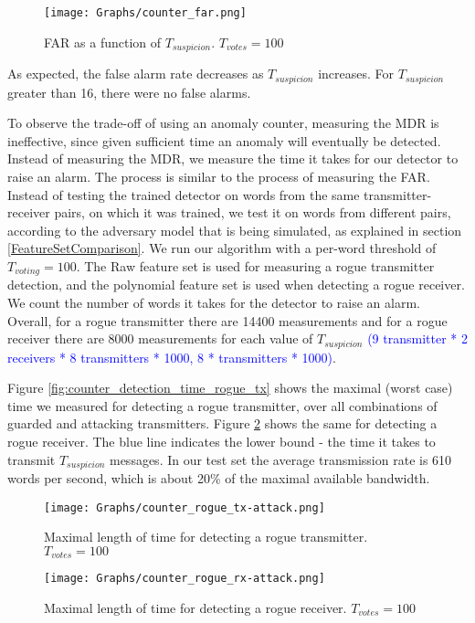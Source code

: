\documentclass[compsoc,conference,a4paper]{IEEEtran}
\begin{document}
  \begin{figure}[t]
    \centering
    \texttt{[image: Graphs/counter\_far.png]}
    \caption{FAR as a function of $T_{suspicion}$. $T_{votes} = 100$}
    \label{fig:counter_far}
  \end{figure}
  
  As expected, the false alarm rate decreases as $T_{suspicion}$ increases. For $T_{suspicion}$ greater than 16, there were no false alarms.
  
  To observe the trade-off of using an anomaly counter, measuring the MDR is ineffective, since given sufficient time an anomaly will eventually be detected. Instead of measuring the MDR, we measure the time it takes for our detector to raise an alarm. The process is similar to the process of measuring the FAR. Instead of testing the trained detector on words from the same transmitter-receiver pairs, on which it was trained, we test it on words from different pairs, according to the adversary model that is being simulated, as explained in section \ref{FeatureSetComparison}. We run our algorithm with a per-word threshold of $T_{voting} = 100$. The Raw feature set is used for measuring a rogue transmitter detection, and the polynomial feature set is used when detecting a rogue receiver. We count the number of words it takes for the detector to raise an alarm. Overall, for a rogue transmitter there are 14400 measurements and for a rogue receiver there are 8000 measurements for each value of $T_{suspicion}$ \textcolor{blue}{(9 transmitter * 2 receivers * 8 transmitters * 1000, 8 * transmitters * 1000)}.
  
  Figure \ref{fig:counter_detection_time_rogue_tx} shows the maximal (worst case) time we measured for detecting a rogue transmitter, over all combinations of guarded and attacking transmitters. Figure \ref{fig:counter_detection_time_rogue_rx} shows the same for detecting a rogue receiver. The blue line indicates the lower bound - the time it takes to transmit $T_{suspicion}$ messages. In our test set the average transmission rate is 610 words per second, which is about 20\% of the maximal available bandwidth.
  
  \begin{figure}[t]
    \centering
    \texttt{[image: Graphs/counter\_rogue\_tx-attack.png]}
    \caption{Maximal length of time for detecting a rogue transmitter. $T_{votes} = 100$}
    \label{fig:counter_detection_time_rogue_tx}
  
    \texttt{[image: Graphs/counter\_rogue\_rx-attack.png]}
    \caption{Maximal length of time for detecting a rogue receiver. $T_{votes} = 100$}
    \label{fig:counter_detection_time_rogue_rx}
  \end{figure}
  
\end{document}
